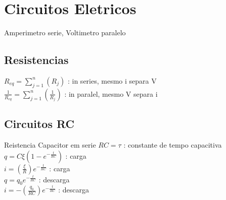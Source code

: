 \section{Circuitos Eletricos}
Amperimetro serie, Voltimetro paralelo\\
\subsection{Resistencias}
$R_{eq}=\sum _{j=1}^n\left(R_j\right)$ : in series, mesmo i separa V\\
$\frac{1}{R_{eq}}=\sum _{j=1}^n\left(\frac{1}{R_j}\right)$ : in paralel, mesmo V separa i\\
\subsection{Circuitos RC}
Reistencia Capacitor em serie $RC = \tau$ : constante de tempo capacitiva\\
$q=C\xi \left(1-e^{-\frac{t}{RC}}\right)$ : carga\\
$i=\left(\frac{\xi }{R}\right)e^{-\frac{t}{RC}}$ : carga\\
$q=q_0e^{-\frac{t}{RC}}$ : descarga\\
$i=-\left(\frac{q_0}{RC}\right)e^{-\frac{t}{RC}}$ : descarga\\
